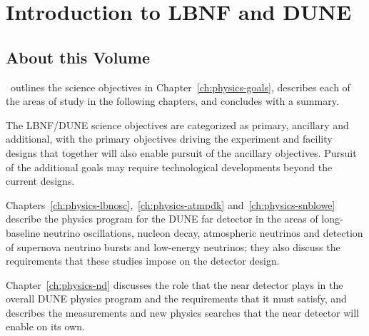 
\chapter{Introduction to LBNF and DUNE}
\label{ch:physics-overview}



\section{About this Volume}

\volphys\, outlines the science objectives in
Chapter~\ref{ch:physics-goals}, describes each of the areas of study in the following
chapters, and concludes with a summary.

The LBNF/DUNE science objectives are categorized as primary, ancillary and additional, 
with the primary objectives driving the experiment and facility designs that together will 
also enable pursuit of the ancillary objectives. 
Pursuit of the additional goals may require technological developments beyond the current designs.

Chapters~\ref{ch:physics-lbnosc},~\ref{ch:physics-atmpdk} and~\ref{ch:physics-snblowe}
describe the physics program for the DUNE far detector in the areas of long-baseline neutrino
oscillations, nucleon decay, atmospheric neutrinos and detection of supernova neutrino
bursts and low-energy neutrinos; they also discuss the requirements that these studies 
impose on the detector design.

Chapter~\ref{ch:physics-nd} discusses the role that the near detector plays in the overall DUNE
physics program and the requirements that it must satisfy, and describes the measurements and 
new physics searches that the near detector will enable on its own.



